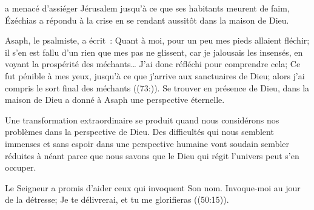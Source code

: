 




 a menacé d'assiéger
 Jérusalem jusqu'à ce que ses habitants meurent de faim,
 Ézéchias a répondu à la crise en se rendant aussitôt
 dans la maison de Dieu. 


Asaph, le psalmiste, a écrit~: 
 \og Quant à moi, pour un peu mes pieds allaient fléchir;
 il s’en est fallu d’un rien que mes pas ne glissent,
 car je jalousais les insensés, en voyant la prospérité des méchants\dots{}
 J’ai donc réfléchi pour comprendre cela; Ce fut pénible à mes yeux,
 jusqu’à ce que j’arrive aux sanctuaires de Dieu;
 alors j’ai compris le sort final des méchants \fg{} ((73:)).
 Se trouver en présence de Dieu, dans la maison de Dieu
 a donné à Asaph une perspective éternelle. 

Une transformation extraordinaire se produit quand nous considérons
 nos problèmes dans la perspective de Dieu.
 Des difficultés qui nous semblent immenses et sans espoir
 dans une perspective humaine vont soudain sembler réduites à néant
 \ocadr parce que nous savons que le Dieu qui régit l'univers
 peut s'en occuper. 

Le Seigneur a promis d'aider ceux qui invoquent Son nom.
 \og Invoque-moi au jour de la détresse; Je te délivrerai,
 et tu me glorifieras \fg{} ((50:15)).

\dvrule






